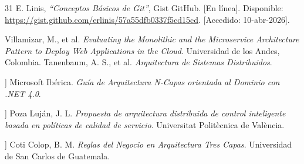 \begin{thebibliography}{31}
E. Linis, \textit{``Conceptos Básicos de Git''}, Gist GitHub. [En línea]. Disponible: \url{https://gist.github.com/erlinis/57a55dfb0337f5cd15cd}. [Accedido: 10-abr-2026].

Villamizar, M., et al. \textit{Evaluating the Monolithic and the Microservice Architecture Pattern to Deploy Web Applications in the Cloud}. Universidad de los Andes, Colombia.
Tanenbaum, A. S., et al. \textit{Arquitectura de Sistemas Distribuidos}.
\item[[3]] Microsoft Ibérica. \textit{Guía de Arquitectura N-Capas orientada al Dominio con .NET 4.0}.

\item[[4]] Poza Luján, J. L. \textit{Propuesta de arquitectura distribuida de control inteligente basada en políticas de calidad de servicio}. Universitat Politècnica de València.

\item[[5]] Coti Colop, B. M. \textit{Reglas del Negocio en Arquitectura Tres Capas}. Universidad de San Carlos de Guatemala.



\fussy %
\end{thebibliography}